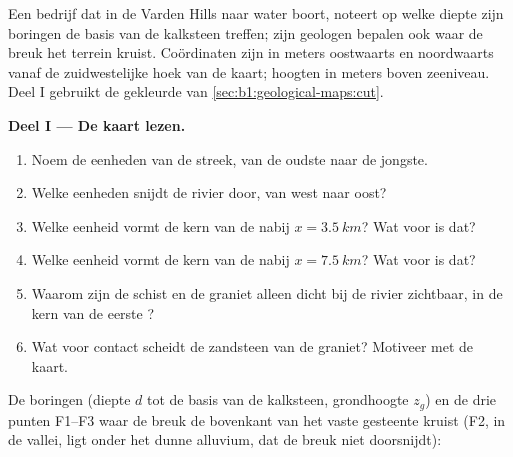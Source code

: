 \begin{problem}
\label{pb:b1:geological-maps:1}
Een bedrijf dat in de Varden Hills naar water boort, noteert op welke diepte zijn boringen de basis van de
kalksteen treffen; zijn geologen bepalen ook waar de breuk het terrein kruist. Coördinaten zijn in meters
oostwaarts en noordwaarts vanaf de zuidwestelijke hoek van de kaart; hoogten in meters boven zeeniveau.
Deel I gebruikt de gekleurde  van \cref{sec:b1:geological-maps:cut}.

\medskip
\noindent\textbf{Deel I --- De kaart lezen.}
\begin{enumerate}
  \item Noem de eenheden van de streek, van de oudste naar de jongste.
  \item Welke eenheden snijdt de rivier door, van west naar oost?
  \item Welke eenheid vormt de kern van de  nabij $x = \qty{3.5}{km}$?
        Wat voor  is dat?
  \item Welke eenheid vormt de kern van de  nabij $x = \qty{7.5}{km}$?
        Wat voor  is dat?
  \item Waarom zijn de schist en de graniet alleen dicht bij de rivier zichtbaar, in de kern van de
        eerste ?
  \item Wat voor contact scheidt de zandsteen van de graniet? Motiveer met de kaart.
\end{enumerate}

\medskip
\noindent De boringen (diepte $d$ tot de basis van de kalksteen, grondhoogte $z_g$) en de drie punten
F1--F3 waar de breuk de bovenkant van het vaste gesteente kruist (F2, in de vallei, ligt onder het dunne
alluvium, dat de breuk niet doorsnijdt):


\end{problem}
